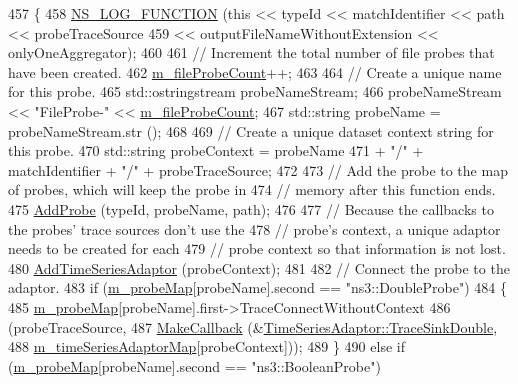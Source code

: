 \begin{DoxyCode}
457 \{
458   \hyperlink{log-macros-disabled_8h_a90b90d5bad1f39cb1b64923ea94c0761}{NS\_LOG\_FUNCTION} (\textcolor{keyword}{this} << typeId << matchIdentifier << path << probeTraceSource
459                         << outputFileNameWithoutExtension << onlyOneAggregator);
460 
461   \textcolor{comment}{// Increment the total number of file probes that have been created.}
462   \hyperlink{classns3_1_1FileHelper_a5ecc1318b7c9a79af79f869fe1e7ceac}{m\_fileProbeCount}++;
463 
464   \textcolor{comment}{// Create a unique name for this probe.}
465   std::ostringstream probeNameStream;
466   probeNameStream << \textcolor{stringliteral}{"FileProbe-"} << \hyperlink{classns3_1_1FileHelper_a5ecc1318b7c9a79af79f869fe1e7ceac}{m\_fileProbeCount};
467   std::string probeName = probeNameStream.str ();
468 
469   \textcolor{comment}{// Create a unique dataset context string for this probe.}
470   std::string probeContext = probeName
471     + \textcolor{stringliteral}{"/"} + matchIdentifier + \textcolor{stringliteral}{"/"} + probeTraceSource;
472 
473   \textcolor{comment}{// Add the probe to the map of probes, which will keep the probe in}
474   \textcolor{comment}{// memory after this function ends.}
475   \hyperlink{classns3_1_1FileHelper_a9783aea2aed4b310288ed1b79af1f66e}{AddProbe} (typeId, probeName, path);
476 
477   \textcolor{comment}{// Because the callbacks to the probes' trace sources don't use the}
478   \textcolor{comment}{// probe's context, a unique adaptor needs to be created for each}
479   \textcolor{comment}{// probe context so that information is not lost.}
480   \hyperlink{classns3_1_1FileHelper_a0f946e4ecd03d5d1aa00b7f851bde702}{AddTimeSeriesAdaptor} (probeContext);
481 
482   \textcolor{comment}{// Connect the probe to the adaptor.}
483   \textcolor{keywordflow}{if} (\hyperlink{classns3_1_1FileHelper_a69184708162929e89458eed5956791e1}{m\_probeMap}[probeName].second == \textcolor{stringliteral}{"ns3::DoubleProbe"})
484     \{
485       \hyperlink{classns3_1_1FileHelper_a69184708162929e89458eed5956791e1}{m\_probeMap}[probeName].first->TraceConnectWithoutContext
486         (probeTraceSource,
487         \hyperlink{group__makecallbackmemptr_ga9376283685aa99d204048d6a4b7610a4}{MakeCallback} (&\hyperlink{classns3_1_1TimeSeriesAdaptor_a7b5499ffc99cfe741948166ede81980a}{TimeSeriesAdaptor::TraceSinkDouble},
488                       \hyperlink{classns3_1_1FileHelper_a2e55bee0c776ab5f14cc2d4dfbfcc361}{m\_timeSeriesAdaptorMap}[probeContext]));
489     \}
490   \textcolor{keywordflow}{else} \textcolor{keywordflow}{if} (\hyperlink{classns3_1_1FileHelper_a69184708162929e89458eed5956791e1}{m\_probeMap}[probeName].second == \textcolor{stringliteral}{"ns3::BooleanProbe"})

\end{DoxyCode}
